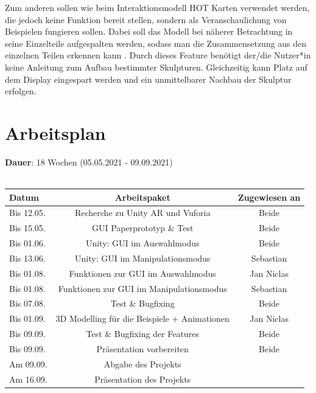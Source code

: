 \documentclass[12pt,a4paper, oneside]{scrartcl}
\begin{document}
Zum anderen sollen wie beim Interaktionsmodell HOT Karten verwendet werden, die jedoch keine Funktion bereit stellen, sondern als Veranschaulichung von Beispielen fungieren sollen. Dabei soll das Modell bei näherer Betrachtung in seine Einzelteile aufgespalten werden, sodass man die Zusammensetzung aus den einzelnen Teilen erkennen kann \cite{youtube_unity}. Durch dieses Feature benötigt der/die Nutzer*in keine Anleitung zum Aufbau bestimmter Skulpturen. Gleichzeitig kann Platz auf dem Display eingespart werden und ein unmittelbarer Nachbau der Skulptur erfolgen.\\




\newpage




\section{Arbeitsplan}
\textbf{Dauer}: 18 Wochen (05.05.2021 - 09.09.2021) \\
%
\\
\begin{tabular}{|l|c|c|}
\hline
Datum & Arbeitspaket & Zugewiesen an \\
\hline
Bis 12.05. & Recherche zu Unity AR und Vuforia & Beide \\
\hline
Bis 15.05. & GUI Paperprototyp \& Test & Beide \\
\hline
Bis 01.06. & Unity: GUI im Auswahlmodus  & Beide \\
\hline
Bis 13.06. & Unity: GUI im Manipulationsmodus & Sebastian \\
\hline
Bis 01.08. & Funktionen zur GUI im Auswahlmodus & Jan Niclas \\
\hline
Bis 01.08. & Funktionen zur GUI im Manipulationsmodus & Sebastian \\
\hline
Bis 07.08. & Test \& Bugfixing & Beide \\
\hline
Bis 01.09. & 3D Modelling für die Beispiele + Animationen & Jan Niclas \\
\hline
Bis 09.09. & Test \& Bugfixing der Features & Beide \\
\hline
Bis 09.09. & Präsentation vorbereiten & Beide \\
\hline
Am  09.09. & Abgabe des Projekts & \\
\hline
Am  16.09. & Präsentation des Projekts & \\
\hline
\end{tabular}



\newpage





\end{document}
